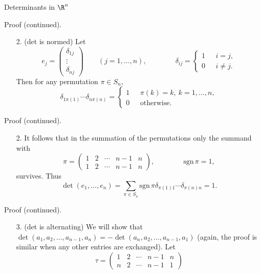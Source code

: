 \documentclass[smaller,hyperref={CJKbookmarks=true}]{beamer}
\begin{document}
\begin{frame}{Determinants in $\R^n$}
\begin{spacing}{1.05}
\newpage
\vspace*{20pt}
\alert{Proof (continued).}\\
\begin{itemize}
  \item[2.] (det is normed) Let
  \[e_j=\begin{pmatrix}
          \delta_{1j} \\
          \vdots \\
          \delta_{nj}
        \end{pmatrix}\qquad (j=1,\ldots,n),\qquad\qquad \delta_{ij}=\left\{\begin{aligned}1~~~&i=j,\\ 0~~~&i\neq j.\end{aligned}\right.\]
  Then for any permutation $\pi\in S_n$,
  \[\delta_{1\pi(1)}\cdots\delta_{n\pi(n)}=\left\{\begin{aligned}1~~~&\pi(k)=k,~k=1,\ldots,n,\\
  0~~~&\text{otherwise.}\end{aligned}\right.\]
\end{itemize}
\newpage
\vspace*{18pt}
\alert{Proof (continued).}\\
\begin{itemize}
  \item[2.] It follows that in the summation of the permutations only the summand with
      \[\pi=\begin{pmatrix}
              1 & 2 & \cdots & n-1 & n \\
              1 & 2 & \cdots & n-1 & n
            \end{pmatrix},\qquad\qquad\text{sgn}\,\pi=1,\]
      survives. Thus
      \[\det(e_1,\ldots,e_n)=\sum_{\pi\in S_n}\text{sgn}\,\pi\delta_{\pi(1)1}\cdots\delta_{\pi(n)n}=1.\]
\end{itemize}
\newpage
\vspace*{20pt}
\alert{Proof (continued).}\\
\begin{itemize}
  \item[3.] (det is alternating) We will show that $\det(a_1,a_2,\ldots,a_{n-1},a_n)=-\det(a_n,a_2,\ldots,a_{n-1},a_1)$ (again, the proof is similar when any other entries are exchanged). Let
      \begin{equation}\label{1.7.18}
        \tau=\begin{pmatrix}
               1 & 2 & \cdots & n-1 & n \\
               n & 2 & \cdots & n-1 & 1

\end{pmatrix}
\end{equation}
\end{itemize}
\end{spacing}
\end{frame}
\end{document}
